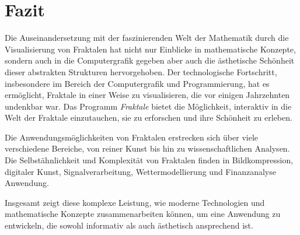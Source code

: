 \chapter{Fazit}
\thispagestyle{fancy} %

Die Auseinandersetzung mit der faszinierenden Welt der Mathematik durch die
Visualisierung von Fraktalen hat nicht nur Einblicke in mathematische Konzepte,
sondern auch in die Computergrafik gegeben aber auch die ästhetische Schönheit
dieser abstrakten Strukturen hervorgehoben. \hfill \break \newline \noindent
Der technologische Fortschritt, insbesondere im Bereich der Computergrafik und
Programmierung, hat es ermöglicht, Fraktale in einer Weise zu visualisieren,
die vor einigen Jahrzehnten undenkbar war. Das Programm \textit{Fraktale}
bietet die Möglichkeit, interaktiv in die Welt der Fraktale einzutauchen, sie
zu erforschen und ihre Schönheit zu erleben.

\hfill \break  \noindent
Die Anwendungsmöglichkeiten von Fraktalen erstrecken sich über viele verschiedene Bereiche, von reiner Kunst bis hin zu wissenschaftlichen Analysen. Die Selbstähnlichkeit und Komplexität von Fraktalen finden in Bildkompression, digitaler Kunst, Signalverarbeitung, Wettermodellierung und Finanzanalyse Anwendung.

\hfill \break  \noindent
Insgesamt zeigt diese komplexe Leistung, wie moderne Technologien und mathematische Konzepte zusammenarbeiten können, um eine Anwendung zu entwickeln, die sowohl informativ als auch ästhetisch ansprechend ist.